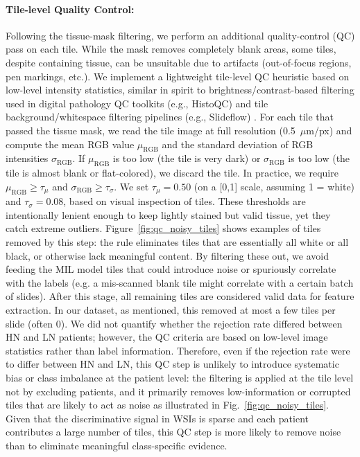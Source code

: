 \paragraph{Tile-level Quality Control:} Following the tissue-mask filtering, we perform an additional quality-control (QC) pass on each tile. While the mask removes completely blank areas, some tiles, despite containing tissue, can be unsuitable due to artifacts (out-of-focus regions, pen markings, etc.). We implement a lightweight tile-level QC heuristic based on low-level intensity statistics, similar in spirit to brightness/contrast-based filtering used in digital pathology QC toolkits (e.g., HistoQC) and tile background/whitespace filtering pipelines (e.g., Slideflow) \cite{janowczyk2019histoqc,dolezal2024slideflow}.
For each tile that passed the tissue mask, we read the tile image at full resolution (0.5~$\mu$m/px) and compute the mean RGB value $\mu_{\text{RGB}}$ and the standard deviation of RGB intensities $\sigma_{\text{RGB}}$. If $\mu_{\text{RGB}}$ is too low (the tile is very dark) or $\sigma_{\text{RGB}}$ is too low (the tile is almost blank or flat-colored), we discard the tile. In practice, we require $\mu_{\text{RGB}} \ge \tau_{\mu}$ and $\sigma_{\text{RGB}} \ge \tau_{\sigma}$. We set $\tau_{\mu}=0.50$ (on a [0,1] scale, assuming 1 = white) and $\tau_{\sigma}=0.08$, based on visual inspection of tiles. These thresholds are intentionally lenient enough to keep lightly stained but valid tissue, yet they catch extreme outliers. Figure~\ref{fig:qc_noisy_tiles} shows examples of tiles removed by this step: the rule eliminates tiles that are essentially all white or all black, or otherwise lack meaningful content. By filtering these out, we avoid feeding the MIL model tiles that could introduce noise or spuriously correlate with the labels (e.g. a mis-scanned blank tile might correlate with a certain batch of slides). After this stage, all remaining tiles are considered valid data for feature extraction. In our dataset, as mentioned, this removed at most a few tiles per slide (often 0). We did not quantify whether the rejection rate differed between HN and LN patients; however, the QC criteria are based on low-level image statistics rather than label information. Therefore, even if the rejection rate were to differ between HN and LN, this QC step is unlikely to introduce systematic bias or class imbalance at the patient level: the filtering is applied at the tile level not by excluding patients, and it primarily removes low-information or corrupted tiles that are likely to act as noise as illustrated in Fig.~\ref{fig:qc_noisy_tiles}. Given that the discriminative signal in WSIs is sparse and each patient contributes a large number of tiles, this QC step is more likely to remove noise than to eliminate meaningful class-specific evidence.

